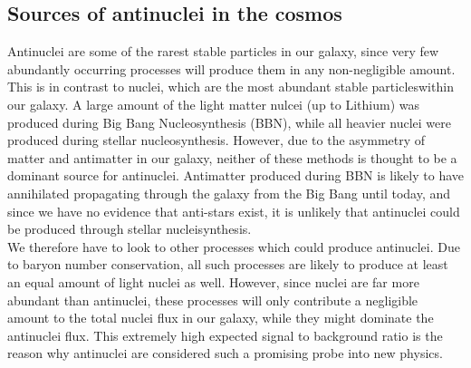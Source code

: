 \subsection{Sources of antinuclei in the cosmos}
Antinuclei are some of the rarest stable particles in our galaxy, since very few abundantly occurring processes will produce them in any non-negligible amount\cite{}. This is in contrast to nuclei, which are the most abundant stable particleswithin our galaxy. A large amount of the light matter nulcei (up to Lithium) was produced during Big Bang Nucleosynthesis (BBN)\cite{}, while all heavier nuclei were produced during stellar nucleosynthesis\cite{}. However, due to the asymmetry of matter and antimatter in our galaxy, neither of these methods is thought to be a dominant source for antinuclei. Antimatter produced during BBN is likely to have annihilated propagating through the galaxy from the Big Bang until today, and since we have no evidence that anti-stars exist\cite{}, it is unlikely that antinuclei could be produced through stellar nucleisynthesis. \\
We therefore have to look to other processes which could produce antinuclei. Due to baryon number conservation, all such processes are likely to produce at least an equal amount of light nuclei as well. However, since nuclei are far more abundant than antinuclei, these processes will only contribute a negligible amount to the total nuclei flux in our galaxy, while they might dominate the antinuclei flux. This extremely high expected signal to background ratio is the reason why antinuclei are considered such a promising probe into new physics.

